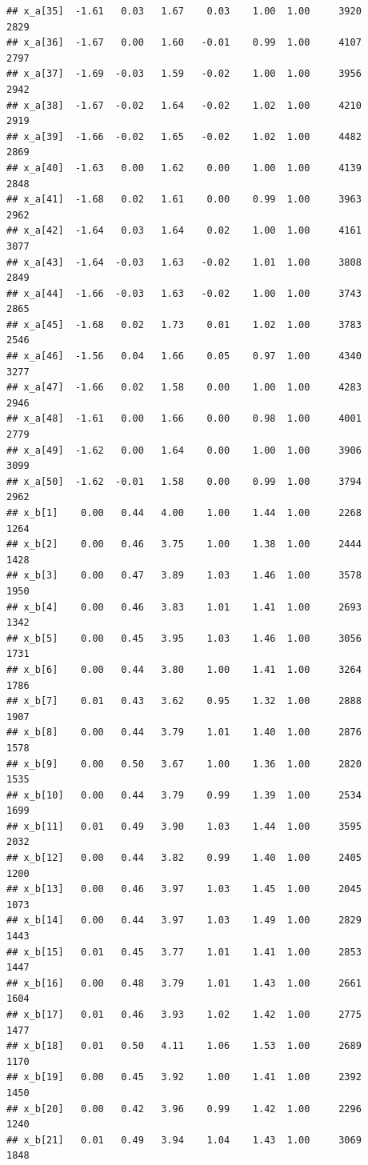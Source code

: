 \documentclass[american,]{article}
\begin{document}
\begin{verbatim}
## x_a[35]  -1.61   0.03   1.67    0.03    1.00  1.00     3920     2829
## x_a[36]  -1.67   0.00   1.60   -0.01    0.99  1.00     4107     2797
## x_a[37]  -1.69  -0.03   1.59   -0.02    1.00  1.00     3956     2942
## x_a[38]  -1.67  -0.02   1.64   -0.02    1.02  1.00     4210     2919
## x_a[39]  -1.66  -0.02   1.65   -0.02    1.02  1.00     4482     2869
## x_a[40]  -1.63   0.00   1.62    0.00    1.00  1.00     4139     2848
## x_a[41]  -1.68   0.02   1.61    0.00    0.99  1.00     3963     2962
## x_a[42]  -1.64   0.03   1.64    0.02    1.00  1.00     4161     3077
## x_a[43]  -1.64  -0.03   1.63   -0.02    1.01  1.00     3808     2849
## x_a[44]  -1.66  -0.03   1.63   -0.02    1.00  1.00     3743     2865
## x_a[45]  -1.68   0.02   1.73    0.01    1.02  1.00     3783     2546
## x_a[46]  -1.56   0.04   1.66    0.05    0.97  1.00     4340     3277
## x_a[47]  -1.66   0.02   1.58    0.00    1.00  1.00     4283     2946
## x_a[48]  -1.61   0.00   1.66    0.00    0.98  1.00     4001     2779
## x_a[49]  -1.62   0.00   1.64    0.00    1.00  1.00     3906     3099
## x_a[50]  -1.62  -0.01   1.58    0.00    0.99  1.00     3794     2962
## x_b[1]    0.00   0.44   4.00    1.00    1.44  1.00     2268     1264
## x_b[2]    0.00   0.46   3.75    1.00    1.38  1.00     2444     1428
## x_b[3]    0.00   0.47   3.89    1.03    1.46  1.00     3578     1950
## x_b[4]    0.00   0.46   3.83    1.01    1.41  1.00     2693     1342
## x_b[5]    0.00   0.45   3.95    1.03    1.46  1.00     3056     1731
## x_b[6]    0.00   0.44   3.80    1.00    1.41  1.00     3264     1786
## x_b[7]    0.01   0.43   3.62    0.95    1.32  1.00     2888     1907
## x_b[8]    0.00   0.44   3.79    1.01    1.40  1.00     2876     1578
## x_b[9]    0.00   0.50   3.67    1.00    1.36  1.00     2820     1535
## x_b[10]   0.00   0.44   3.79    0.99    1.39  1.00     2534     1699
## x_b[11]   0.01   0.49   3.90    1.03    1.44  1.00     3595     2032
## x_b[12]   0.00   0.44   3.82    0.99    1.40  1.00     2405     1200
## x_b[13]   0.00   0.46   3.97    1.03    1.45  1.00     2045     1073
## x_b[14]   0.00   0.44   3.97    1.03    1.49  1.00     2829     1443
## x_b[15]   0.01   0.45   3.77    1.01    1.41  1.00     2853     1447
## x_b[16]   0.00   0.48   3.79    1.01    1.43  1.00     2661     1604
## x_b[17]   0.01   0.46   3.93    1.02    1.42  1.00     2775     1477
## x_b[18]   0.01   0.50   4.11    1.06    1.53  1.00     2689     1170
## x_b[19]   0.00   0.45   3.92    1.00    1.41  1.00     2392     1450
## x_b[20]   0.00   0.42   3.96    0.99    1.42  1.00     2296     1240
## x_b[21]   0.01   0.49   3.94    1.04    1.43  1.00     3069     1848

\end{verbatim}
\end{document}
